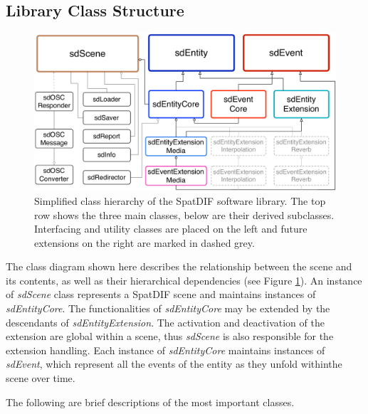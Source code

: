 \documentclass{article}
\begin{document}
\subsection{Library Class Structure}\label{subsec:class_structure}

\begin{figure}[bh]
	\centering
	\includegraphics[width=\columnwidth]{class_diagram.pdf}
	\caption{Simplified class hierarchy of the SpatDIF software library. The top row shows the three main classes, below are their derived subclasses. Interfacing and utility classes are placed on the left and future extensions on the right are marked in dashed grey.}
	\label{fig:class_structure}

\end{figure}

The class diagram shown here describes the relationship between the scene and its contents, as well as their hierarchical dependencies (see Figure \ref{fig:class_structure}). 
An instance of \emph{sdScene} class represents a SpatDIF scene and maintains instances of \emph{sdEntityCore}. The functionalities of \emph{sdEntityCore} may be extended by the descendants of \emph{sdEntityExtension}. 
The activation and deactivation of the extension are global within a scene, thus \emph{sdScene} is also responsible for the extension handling.
Each instance of \emph{sdEntityCore} maintains instances of \emph{sdEvent}, which represent all the events of the entity as they unfold withinthe scene over time.

The following are brief descriptions of the most important classes.

\end{document}
